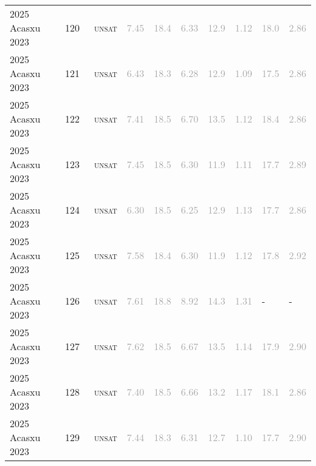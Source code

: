 \begin{center}
{\begin{longtable}{@{}llllllllll@{}}
2025 Acasxu 2023 & 120 & ~\textsc{unsat} & \textcolor{darkgray}{7.45} & \textcolor{darkgray}{18.4} & \textcolor{darkgray}{6.33} & \textcolor{darkgray}{12.9} & \textcolor{darkgray}{1.12} & \textcolor{darkgray}{18.0} & \textcolor{darkgray}{2.86} \\
2025 Acasxu 2023 & 121 & ~\textsc{unsat} & \textcolor{darkgray}{6.43} & \textcolor{darkgray}{18.3} & \textcolor{darkgray}{6.28} & \textcolor{darkgray}{12.9} & \textcolor{darkgray}{1.09} & \textcolor{darkgray}{17.5} & \textcolor{darkgray}{2.86} \\
2025 Acasxu 2023 & 122 & ~\textsc{unsat} & \textcolor{darkgray}{7.41} & \textcolor{darkgray}{18.5} & \textcolor{darkgray}{6.70} & \textcolor{darkgray}{13.5} & \textcolor{darkgray}{1.12} & \textcolor{darkgray}{18.4} & \textcolor{darkgray}{2.86} \\
2025 Acasxu 2023 & 123 & ~\textsc{unsat} & \textcolor{darkgray}{7.45} & \textcolor{darkgray}{18.5} & \textcolor{darkgray}{6.30} & \textcolor{darkgray}{11.9} & \textcolor{darkgray}{1.11} & \textcolor{darkgray}{17.7} & \textcolor{darkgray}{2.89} \\
2025 Acasxu 2023 & 124 & ~\textsc{unsat} & \textcolor{darkgray}{6.30} & \textcolor{darkgray}{18.5} & \textcolor{darkgray}{6.25} & \textcolor{darkgray}{12.9} & \textcolor{darkgray}{1.13} & \textcolor{darkgray}{17.7} & \textcolor{darkgray}{2.86} \\
2025 Acasxu 2023 & 125 & ~\textsc{unsat} & \textcolor{darkgray}{7.58} & \textcolor{darkgray}{18.4} & \textcolor{darkgray}{6.30} & \textcolor{darkgray}{11.9} & \textcolor{darkgray}{1.12} & \textcolor{darkgray}{17.8} & \textcolor{darkgray}{2.92} \\
2025 Acasxu 2023 & 126 & ~\textsc{unsat} & \textcolor{darkgray}{7.61} & \textcolor{darkgray}{18.8} & \textcolor{darkgray}{8.92} & \textcolor{darkgray}{14.3} & \textcolor{darkgray}{1.31} & - & - \\
2025 Acasxu 2023 & 127 & ~\textsc{unsat} & \textcolor{darkgray}{7.62} & \textcolor{darkgray}{18.5} & \textcolor{darkgray}{6.67} & \textcolor{darkgray}{13.5} & \textcolor{darkgray}{1.14} & \textcolor{darkgray}{17.9} & \textcolor{darkgray}{2.90} \\
2025 Acasxu 2023 & 128 & ~\textsc{unsat} & \textcolor{darkgray}{7.40} & \textcolor{darkgray}{18.5} & \textcolor{darkgray}{6.66} & \textcolor{darkgray}{13.2} & \textcolor{darkgray}{1.17} & \textcolor{darkgray}{18.1} & \textcolor{darkgray}{2.86} \\
2025 Acasxu 2023 & 129 & ~\textsc{unsat} & \textcolor{darkgray}{7.44} & \textcolor{darkgray}{18.3} & \textcolor{darkgray}{6.31} & \textcolor{darkgray}{12.7} & \textcolor{darkgray}{1.10} & \textcolor{darkgray}{17.7} & \textcolor{darkgray}{2.90} \\

\end{longtable}}
\end{center}
